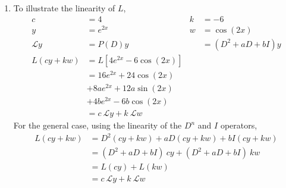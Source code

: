 \begin{enumerate}
    \item To illustrate the linearity of $ L $,
          \begin{align}
              c            & = 4                                 & k & = -6                 \\
              y            & = e^{2x}                            & w & = \cos(2x)           \\
              \mathcal{L}y & = P(D)y                             &   & = (D^{2} + aD + bI)y \\
              L(cy + kw)   & = L[4e^{2x} -6 \cos(2x)]                                       \\
                           & = 16e^{2x} + 24\cos (2x) \nonumber                             \\
                           & + 8ae^{2x} + 12a \sin(2x) \nonumber                            \\
                           & + 4be^{2x} - 6b \cos(2x)                                       \\
                           & = c\ \mathcal{L}y+ k\ \mathcal{L}w
          \end{align}
          For the general case, using the linearity of the $ D^{n} $ and $ I $ operators,
          \begin{align}
              L(cy + kw) & = D^{2}(cy + kw) + aD(cy + kw) + bI(cy + kw)    \\
                         & = (D^{2} + aD + bI)\ cy + (D^{2} + aD + bI)\ kw \\
                         & = L(cy) + L(kw)                                 \\
                         & = c\ \mathcal{L}y+ k\ \mathcal{L}w
          \end{align}


\end{enumerate}
